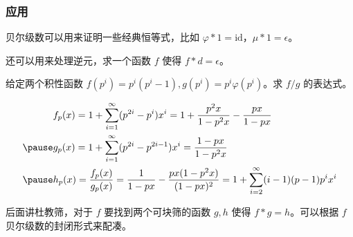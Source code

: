 \documentclass[../main.tex]{subfiles}
\begin{document}
\subsubsection{应用}

\begin{frame}
贝尔级数可以用来证明一些经典恒等式，比如 $\varphi*1=\text{id}$，$\mu*1=\epsilon$。\pause

还可以用来处理逆元，求一个函数 $f$ 使得 $f*d=\epsilon$。\pause

\begin{eg}
给定两个积性函数 $f(p^i)=p^i(p^i-1),g(p^i)=p^i\varphi(p^i)$。求 $f/g$ 的表达式。
\end{eg}
\end{frame}

\begin{frame}
$$
\begin{aligned}
& f_p(x)=1+\sum_{i=1}^{\infty}(p^{2i}-p^i)x^i=1+\frac{p^2x}{1-p^2x}-\frac{px}{1-px}\\ \pause
& g_p(x)=1+\sum_{i=1}^{\infty}(p^{2i}-p^{2i-1})x^i=\frac{1-px}{1-p^2x}\\ \pause
& h_p(x)=\frac{f_p(x)}{g_p(x)}=\frac{1}{1-px}-\frac{px(1-p^2x)}{(1-px)^2}=1+\sum_{i=2}^{\infty}(i-1)(p-1)p^ix^i
\end{aligned}
$$\pause

后面讲杜教筛，对于 $f$ 要找到两个可块筛的函数 $g,h$ 使得 $f*g=h$。可以根据 $f$ 贝尔级数的封闭形式来配凑。
\end{frame}
\end{document}
